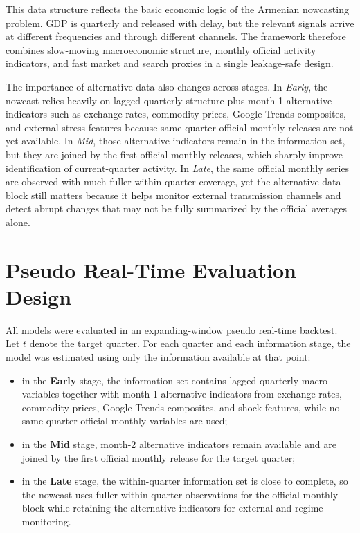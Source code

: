 \documentclass[12pt,a4paper]{article}
\begin{document}
This data structure reflects the basic economic logic of the Armenian nowcasting problem. GDP is quarterly and released with delay, but the relevant signals arrive at different frequencies and through different channels. The framework therefore combines slow-moving macroeconomic structure, monthly official activity indicators, and fast market and search proxies in a single leakage-safe design.

The importance of alternative data also changes across stages. In \textit{Early}, the nowcast relies heavily on lagged quarterly structure plus month-1 alternative indicators such as exchange rates, commodity prices, Google Trends composites, and external stress features because same-quarter official monthly releases are not yet available. In \textit{Mid}, those alternative indicators remain in the information set, but they are joined by the first official monthly releases, which sharply improve identification of current-quarter activity. In \textit{Late}, the same official monthly series are observed with much fuller within-quarter coverage, yet the alternative-data block still matters because it helps monitor external transmission channels and detect abrupt changes that may not be fully summarized by the official averages alone.

\section{Pseudo Real-Time Evaluation Design}

All models were evaluated in an expanding-window pseudo real-time backtest. Let $t$ denote the target quarter. For each quarter and each information stage, the model was estimated using only the information available at that point:
\begin{itemize}
    \item in the \textbf{Early} stage, the information set contains lagged quarterly macro variables together with month-1 alternative indicators from exchange rates, commodity prices, Google Trends composites, and shock features, while no same-quarter official monthly variables are used;
    \item in the \textbf{Mid} stage, month-2 alternative indicators remain available and are joined by the first official monthly release for the target quarter;
    \item in the \textbf{Late} stage, the within-quarter information set is close to complete, so the nowcast uses fuller within-quarter observations for the official monthly block while retaining the alternative indicators for external and regime monitoring.
\end{itemize}
\end{document}
